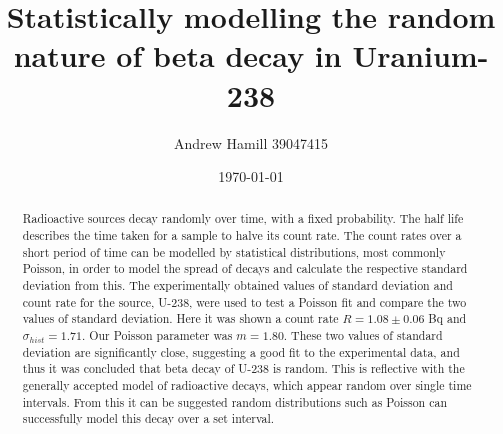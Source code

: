 \documentclass[11pt]{article}
\begin{document}
    \title{Statistically modelling the random nature of beta decay in Uranium-238}
    \author{Andrew Hamill 39047415}
    \date{\today}
    \maketitle

    \begin{abstract}
    \normalsize Radioactive sources decay randomly over time, with a fixed probability. The half life describes the time taken for a sample to halve its count rate. The count rates over a short period of time can be modelled by statistical distributions, most commonly Poisson, in order to model the spread of decays and calculate the respective standard deviation from this. The experimentally obtained values of standard deviation and count rate for the source, U-238, were used to test a Poisson fit and compare the two values of standard deviation. Here it was shown a count rate $ R = 1.08 \pm 0.06$ Bq and $\sigma_{hist} = 1.71$. Our Poisson parameter was $m = 1.80$. These two values of standard deviation are significantly close, suggesting a good fit to the experimental data, and thus it was concluded that beta decay of U-238 is random. This is reflective with the generally accepted model of radioactive decays, which appear random over single time intervals. From this it can be suggested random distributions such as Poisson can successfully model this decay over a set interval. 
    \end{abstract}
\end{document}

